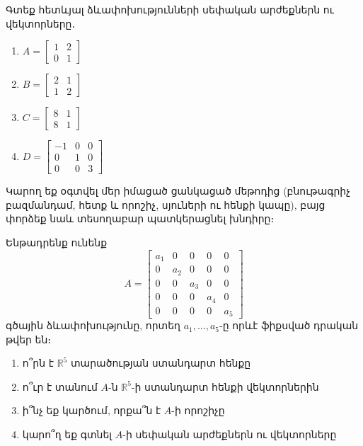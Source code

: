 \begin{problem}
Գտեք հետևյալ ձևափոխությունների սեփական արժեքներն ու վեկտորները․

\begin{enumerate}[label={\alph*}․]
\item $A=\begin{bmatrix}
    1&2\\0&1\end{bmatrix}$

\item $B=\begin{bmatrix}
    2&1\\1&2
\end{bmatrix}$

\item $C=\begin{bmatrix}
    8 & 1 \\ 8 & 1
\end{bmatrix}$

\item $D=\begin{bmatrix}
-1&0&0\\0&1&0\\0&0&3        \end{bmatrix}$
\end{enumerate}

Կարող եք օգտվել մեր իմացած ցանկացած մեթոդից (բնութագրիչ բազմանդամ, հետք և որոշիչ, սյուների ու հենքի կապը), բայց փորձեք նաև տեսողաբար պատկերացնել խնդիրը։
\end{problem}



\begin{problem}
Ենթադրենք ունենք
\[
A=\begin{bmatrix}
    a_1 & 0 & 0 & 0 & 0 \\
    0 & a_2 & 0 & 0 & 0 \\
    0 & 0 & a_3 & 0 & 0 \\
    0 & 0 & 0 & a_4 & 0 \\
    0 & 0 & 0 & 0 & a_5 
\end{bmatrix}
\]
գծային ձևափոխությունը, որտեղ $a_1, \dots, a_5$-ը որևէ ֆիքսված դրական թվեր են։
\begin{enumerate}[label={\alph*}․]
\item ո՞րն է $\mathbb{R}^5$ տարածության ստանդարտ հենքը

\item ո՞ւր է տանում $A$-ն $\mathbb{R}^5$-ի ստանդարտ հենքի վեկտորներին

\item ի՞նչ եք կարծում, որքա՞ն է $A$-ի որոշիչը

\item կարո՞ղ եք գտնել $A$-ի սեփական արժեքներն ու վեկտորները
\end{enumerate}


\end{problem}


